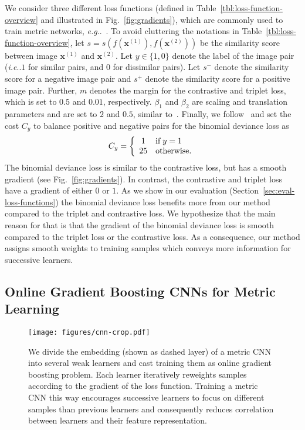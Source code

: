 \documentclass[10pt,journal,compsoc]{IEEEtran}
\makeatletter
\DeclareRobustCommand\onedot{\futurelet\@let@token\@onedot}
\def\@onedot{\ifx\@let@token.\else.\null\fi\xspace}
\def\eg{\emph{e.g}\onedot} \def\Eg{\emph{E.g}\onedot}
\def\ie{\emph{i.e}\onedot} \def\Ie{\emph{I.e}\onedot}
\makeatother
\begin{document}
We consider three different loss functions (defined in Table~\ref{tbl:loss-function-overview} and illustrated in Fig.~\ref{fig:gradients}), which are commonly used to train metric networks,
\eg~\cite{kumar2016learning, parkhi2015deep, schroff2015facenet, shi2016}. 
To avoid cluttering the notations in Table~\ref{tbl:loss-function-overview}, let $s = s(f(\boldsymbol{x}^{(1)}), f(\boldsymbol{x}^{(2)}))$ 
be the similarity score between image $\boldsymbol{x}^{(1)}$ and $\boldsymbol{x}^{(2)}$. Let $y \in \{1, 0\}$ denote the label of 
the image pair (\ie$1$ for similar pairs, and $0$ for dissimilar pairs). Let $s^-$ denote the similarity score for a negative
image pair and $s^+$ denote the similarity score for a positive image pair. Further, $m$ denotes the margin for the contrastive and triplet loss, which 
is set to $0.5$ and $0.01$, respectively. $\beta_1$ and $\beta_2$ are scaling and translation parameters and are set to 
$2$ and $0.5$, similar to~\cite{ustinova2016histogram}. Finally, we follow~\cite{ustinova2016histogram} and set the cost $C_y$ to balance positive and negative pairs for the binomial deviance loss as
\begin{equation}
C_y = \left\{
    \begin{array}{c l}
        1  & \text{if}\; y = 1 \\
        25 & \text{otherwise}.
    \end{array} \right.
\end{equation}%
The binomial deviance loss is similar to the contrastive loss, but has a smooth gradient (see Fig.~\ref{fig:gradients}).
In contrast, the contrastive and triplet loss have a gradient of either $0$ or $1$.
As we show in our evaluation (Section~\ref{sec:eval-loss-functions}) the binomial deviance loss benefits more from our method compared 
to the triplet and contrastive loss. We hypothesize that the main reason for that is that the gradient of the binomial deviance loss is 
smooth compared to the triplet loss or the contrastive loss.
As a consequence,
our method assigns smooth weights to training samples which conveys more information for successive learners.

\subsection{Online Gradient Boosting CNNs for Metric Learning}\label{sec:gradient-boosting}\begin{figure}[t]
    \begin{center}
        \texttt{[image: figures/cnn-crop.pdf]}
    \end{center}
    \caption{We divide the embedding (shown as dashed layer) of a metric \ac{CNN} into several weak learners and cast training them as online gradient boosting problem.
    Each learner iteratively reweights samples according to the gradient of the loss function. 
    Training a metric \ac{CNN} this way encourages successive learners to focus on different samples than previous learners and consequently reduces correlation between learners and their feature representation.
}
    \label{fig:overview}
\end{figure}
\end{document}
